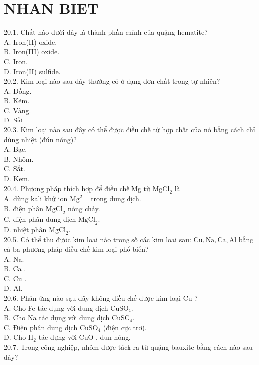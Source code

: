 \documentclass[10pt]{article}
\begin{document}
\section*{NHAN BIET}
20.1. Chất nào dưới đây là thành phần chính của quặng hematite?\\
A. Iron(II) oxide.\\
B. Iron(III) oxide.\\
C. Iron.\\
D. Iron(II) sulfide.\\
20.2. Kim loại nào sau đây thường có ở dạng đơn chất trong tự nhiên?\\
A. Đồng.\\
B. Kẽm.\\
C. Vàng.\\
D. Sắt.\\
20.3. Kim loại nào sau đây có thể được điều chế từ hợp chất của nó bằng cách chỉ dùng nhiệt (đún nóng)?\\
A. Bạc.\\
B. Nhôm.\\
C. Sắt.\\
D. Kēm.\\
20.4. Phương pháp thích hợp để điều chế Mg từ $\mathrm{MgCl}_{2}$ là\\
A. dùng kali khử ion $\mathrm{Mg}^{2+}$ trong dung dịch.\\
B. điện phân $\mathrm{MgCl}_{2}$ nóng chảy.\\
C. điện phân dung dịch $\mathrm{MgCl}_{2}$.\\
D. nhiệt phân $\mathrm{MgCl}_{2}$.\\
20.5. Có thể thu được kim loại nào trong số các kim loại sau: $\mathrm{Cu}, \mathrm{Na}, \mathrm{Ca}, \mathrm{Al}$ bằng cả ba phương pháp điều chế kim loại phổ biến?\\
A. Na.\\
B. Ca .\\
C. Cu .\\
D. Al.\\
20.6. Phản ứng nào sạu đây không điều chế được kim loại Cu ?\\
A. Cho Fe tác dụng với dung dịch $\mathrm{CuSO}_{4}$.\\
B. Cho Na tác dụng với dung dịch $\mathrm{CuSO}_{4}$.\\
C. Điện phân dung dịch $\mathrm{CuSO}_{4}$ (điện cực trơ).\\
D. Cho $\mathrm{H}_{2}$ tác dựng với CuO , đun nóng.\\
20.7. Trong công nghiệp, nhôm được tách ra từ quặng bauxite bằng cách nào sau đây?\\
\end{document}
